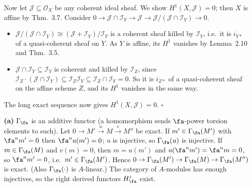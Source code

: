 \documentclass[11pt]{article}
\begin{document}
Now let $\mathcal J\subseteq\mathcal O_X$ be any coherent ideal sheaf. We show $H^1(X,\mathcal J)=0$; then $X$ is affine by Thm.~3.7. Consider $0\to\mathcal J\cap\mathcal I_Y\to\mathcal J\to\mathcal J/(\mathcal J\cap\mathcal I_Y)\to0$.
\begin{itemize}
\item $\mathcal J/(\mathcal J\cap\mathcal I_Y)\cong(\mathcal J+\mathcal I_Y)/\mathcal I_Y$ is a coherent sheaf killed by $\mathcal I_Y$, i.e.\ it is $i_{Y*}$ of a quasi-coherent sheaf on $Y$. As $Y$ is affine, its $H^1$ vanishes by Lemma~2.10 and Thm.~3.5.
\item $\mathcal J\cap\mathcal I_Y\subseteq\mathcal I_Y$ is coherent and killed by $\mathcal I_Z$, since $\mathcal I_Z\cdot(\mathcal J\cap\mathcal I_Y)\subseteq\mathcal I_Z\mathcal I_Y\subseteq\mathcal I_Z\cap\mathcal I_Y=0$. So it is $i_{Z*}$ of a quasi-coherent sheaf on the affine scheme $Z$, and its $H^1$ vanishes in the same way.
\end{itemize}
The long exact sequence now gives $H^1(X,\mathcal J)=0$. \hfill$\square$

\pf
\textbf{(a)} $\Gamma_{\fa}$ is an additive functor (a homomorphism sends $\fa$-power torsion elements to such). Let $0\to M'\xrightarrow{u}M\xrightarrow{v}M''$ be exact. If $m'\in\Gamma_{\fa}(M')$ with $\fa^nm'=0$ then $\fa^nu(m')=0$; $u$ is injective, so $\Gamma_{\fa}(u)$ is injective. If $m\in\Gamma_{\fa}(M)$ and $v(m)=0$, then $m=u(m')$ and $u(\fa^nm')=\fa^nm=0$, so $\fa^nm'=0$, i.e.\ $m'\in\Gamma_{\fa}(M')$. Hence $0\to\Gamma_{\fa}(M')\to\Gamma_{\fa}(M)\to\Gamma_{\fa}(M'')$ is exact. (Also $\Gamma_{\fa}(\cdot)$ is $A$-linear.) The category of $A$-modules has enough injectives, so the right derived functors $H^i_{\fa}$ exist.
\end{document}

